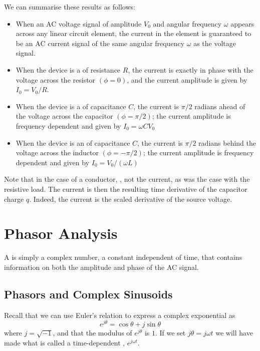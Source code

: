 We can summarise these results as follows: \begin{itemize}
    \item When an AC voltage signal of amplitude $V_0$ and angular frequency $\omega$ appears across any linear circuit element, the current in the element is guaranteed to be an AC current signal of the same angular frequency $\omega$ as the voltage signal.
    \item When the device is a  of resistance $R$, the current is exactly in phase with the voltage across the resistor $(\phi = 0)$, and the current amplitude is given by $I_0 = V_0/R$.
    \item When the device is a  of capacitance $C$, the current is $\pi/2$ radians ahead of the voltage across the capacitor $(\phi = \pi/2)$; the current amplitude is frequency dependent and given by $I_0 = \omega CV_0$
    \item When the device is an  of capacitance $C$, the current is $\pi/2$ radians behind the voltage across the inductor $(\phi = -\pi/2)$; the current amplitude is frequency dependent and given by $I_0 = V_0/(\omega L)$
\end{itemize}

Note that in the case of a conductor, , not the current, as was the case with the resistive load. The current is then the resulting time derivative of the capacitor charge $q$. Indeed, the current is the scaled derivative of the source voltage. 


\chapter{Phasor Analysis}

A  is simply a complex number, a constant independent of time, that contains information on both the amplitude and phase of the AC signal. 

\section{Phasors and Complex Sinusoids}

Recall that we can use Euler's relation to express a complex exponential as $$e^{j\theta} = \cos\theta + j\sin\theta$$ where $j = \sqrt{-1}$, and that the modulus of $e^{j\theta}$ is $1$. If we set $j\theta = j\omega t$ we will have made what is called a time-dependent , $e^{j\omega t}$.

